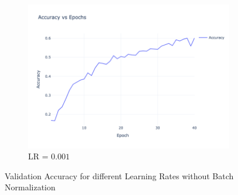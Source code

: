 \begin{figure}[htbp!]
\begin{subfigure}{0.32\textwidth}
    \includegraphics[width=\textwidth]{images/CNN-3-valid-accuracy-lr_0.001.png}
    \caption{LR = $0.001$}
    \end{subfigure}
    \caption{Validation Accuracy for different Learning Rates without Batch Normalization}
    \label{fig:validation_acc_comparison}
    \end{figure}





